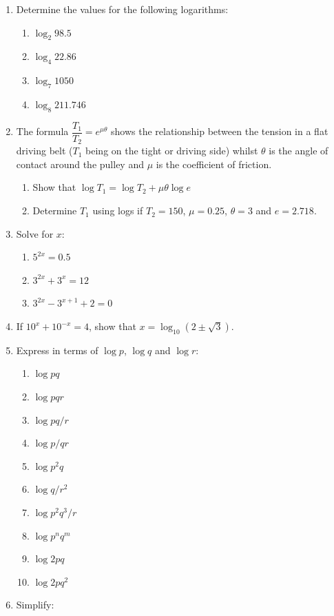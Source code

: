 \documentclass[
  english,
  12pt,
  oneside]{book}
\providecommand{\tightlist}{%
  \setlength{\itemsep}{0pt}\setlength{\parskip}{0pt}}
\theoremstyle{definition}
\theoremstyle{definition}
\theoremstyle{definition}
\theoremstyle{definition}
\theoremstyle{remark}
\begin{document}
\begin{enumerate}
\def\labelenumi{\arabic{enumi}.}
\item
  Determine the values for the following logarithms:

  \begin{enumerate}
  \def\labelenumii{\roman{enumii})}
  \tightlist
  \item
    \(\log_2 98.5\)
  \item
    \(\log_4 22.86\)
  \item
    \(\log_7 1050\)
  \item
    \(\log_8 211.746\)
  \end{enumerate}
\item
  The formula \(\dfrac{T_1}{T_2}=e^{\mu\theta}\) shows the relationship between the tension in a flat driving belt (\(T_1\) being on the tight or driving side) whilst \(\theta\) is the angle of contact around the pulley and \(\mu\) is the coefficient of friction.

  \begin{enumerate}
  \def\labelenumii{\roman{enumii})}
  \tightlist
  \item
    Show that \(\log T_1 = \log T_2 + \mu\theta\log e\)
  \item
    Determine \(T_1\) using logs if \(T_2=150\), \(\mu=0.25\), \(\theta=3\) and \(e=2.718\).
  \end{enumerate}
\item
  Solve for \(x\):

  \begin{enumerate}
  \def\labelenumii{\roman{enumii})}
  \tightlist
  \item
    \(5^{2x}=0.5\)
  \item
    \(3^{2x}+3^x=12\)
  \item
    \(3^{2x}-3^{x+1}+2=0\)
  \end{enumerate}
\item
  If \(10^x+10^{-x}=4\), show that \(x=\log_{10}(2\pm\sqrt{3})\).
\item
  Express in terms of \(\log p\), \(\log q\) and \(\log r\):

  \begin{enumerate}
  \def\labelenumii{\alph{enumii})}
  \tightlist
  \item
    \(\log pq\)
  \item
    \(\log pqr\)
  \item
    \(\log pq/r\)
  \item
    \(\log p/qr\)
  \item
    \(\log p^2q\)
  \item
    \(\log q/r^2\)
  \item
    \(\log p^2q^3/r\)
  \item
    \(\log p^nq^m\)
  \item
    \(\log 2pq\)
  \item
    \(\log 2pq^2\)
  \end{enumerate}
\item
  Simplify:


\end{enumerate}
\end{document}
